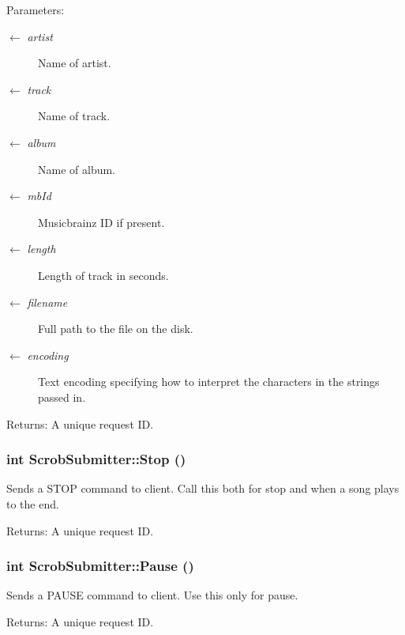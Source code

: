 \begin{Desc}
\item[Parameters:]
\begin{description}
\item[\mbox{$\leftarrow$} {\em artist}]Name of artist. \item[\mbox{$\leftarrow$} {\em track}]Name of track. \item[\mbox{$\leftarrow$} {\em album}]Name of album. \item[\mbox{$\leftarrow$} {\em mbId}]Musicbrainz ID if present. \item[\mbox{$\leftarrow$} {\em length}]Length of track in seconds. \item[\mbox{$\leftarrow$} {\em filename}]Full path to the file on the disk. \item[\mbox{$\leftarrow$} {\em encoding}]Text encoding specifying how to interpret the characters in the strings passed in.\end{description}
\end{Desc}
\begin{Desc}
\item[Returns:]A unique request ID. \end{Desc}
\subsubsection{\setlength{\rightskip}{0pt plus 5cm}int ScrobSubmitter::Stop ()}\label{class_scrob_submitter_566a45131fe2b1420fe01281e0590722}


Sends a STOP command to client. Call this both for stop and when a song plays to the end.

\begin{Desc}
\item[Returns:]A unique request ID. \end{Desc}
\subsubsection{\setlength{\rightskip}{0pt plus 5cm}int ScrobSubmitter::Pause ()}\label{class_scrob_submitter_96b594065992db4a25d5433ae6847997}


Sends a PAUSE command to client. Use this only for pause.

\begin{Desc}
\item[Returns:]A unique request ID. \end{Desc}
